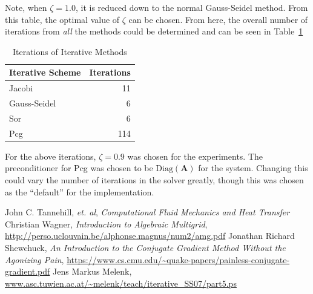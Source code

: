 \documentclass[addpoints]{exam}
\begin{document}
\begin{questions}
\begin{solution}
Note, when $\zeta = 1.0$, it is reduced down to the normal Gauss-Seidel method. From this table, the optimal value of $\zeta$ can be chosen. From here, the overall number of iterations from {\em all} the methods could be determined and can be seen in Table~\ref{table:iterative}

\begin{table}[H]
\centering
\begin{tabular}{l r}
\hline\hline
Iterative Scheme & Iterations\\
\hline
Jacobi & 11\\
Gauss-Seidel & 6\\
{\sc Sor} & 6\\
{\sc Pcg} & 114\\
\hline\hline
\end{tabular}
\caption{Iterations of Iterative Methods}
\label{table:iterative}
\end{table}

For the above iterations, $\zeta = 0.9$ was chosen for the experiments. The preconditioner for {\sc Pcg} was chosen to be $\text{Diag}(\mathbf{A})$ for the system. Changing this could vary the number of iterations in the solver greatly, though this was chosen as the ``default'' for the implementation.
\end{solution}


\end{questions}

\begin{thebibliography}{99}
John C. Tannehill, {\em et. al}, {\em Computational Fluid Mechanics and Heat Transfer}
Christian Wagner, {\em Introduction to Algebraic Multigrid}, \url{http://perso.uclouvain.be/alphonse.magnus/num2/amg.pdf}
Jonathan Richard Shewchuck, {\em An Introduction to the Conjugate Gradient Method Without the Agonizing Pain}, \url{https://www.cs.cmu.edu/~quake-papers/painless-conjugate-gradient.pdf}
Jens Markus Melenk, \url{www.asc.tuwien.ac.at/~melenk/teach/iterative_SS07/part5.ps}
\end{thebibliography}
\end{document}
